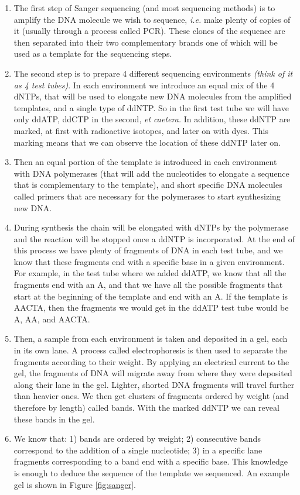 \documentclass[
  11pt,
  twoside]{scrbook}
\providecommand{\tightlist}{%
  \setlength{\itemsep}{0pt}\setlength{\parskip}{0pt}}
\begin{document}
\begin{enumerate}
\def\labelenumi{\arabic{enumi}.}
\tightlist
\item
  The first step of Sanger sequencing (and most sequencing methods) is to amplify the DNA molecule we wish to sequence, \emph{i.e.} make plenty of copies of it (usually through a process called PCR). These clones of the sequence are then separated into their two complementary brands one of which will be used as a template for the sequencing steps.
\item
  The second step is to prepare 4 different sequencing environments \emph{(think of it as 4 test tubes)}. In each environment we introduce an equal mix of the 4 dNTPs, that will be used to elongate new DNA molecules from the amplified templates, and a single type of ddNTP. So in the first test tube we will have only ddATP, ddCTP in the second, \emph{et caetera.} In addition, these ddNTP are marked, at first with radioactive isotopes, and later on with dyes. This marking means that we can observe the location of these ddNTP later on.
\item
  Then an equal portion of the template is introduced in each environment with DNA polymerases (that will add the nucleotides to elongate a sequence that is complementary to the template), and short specific DNA molecules called primers that are necessary for the polymerases to start synthesizing new DNA.
\item
  During synthesis the chain will be elongated with dNTPs by the polymerase and the reaction will be stopped once a ddNTP is incorporated. At the end of this process we have plenty of fragments of DNA in each test tube, and we know that these fragments end with a specific base in a given environment. For example, in the test tube where we added ddATP, we know that all the fragments end with an A, and that we have all the possible fragments that start at the beginning of the template and end with an A. If the template is AACTA, then the fragments we would get in the ddATP test tube would be A, AA, and AACTA.
\item
  Then, a sample from each environment is taken and deposited in a gel, each in its own lane. A process called electrophoresis is then used to separate the fragments according to their weight. By applying an electrical current to the gel, the fragments of DNA will migrate away from where they were deposited along their lane in the gel. Lighter, shorted DNA fragments will travel further than heavier ones. We then get clusters of fragments ordered by weight (and therefore by length) called bands. With the marked ddNTP we can reveal these bands in the gel.
\item
  We know that: 1) bands are ordered by weight; 2) consecutive bands correspond to the addition of a single nucleotide; 3) in a specific lane fragments corresponding to a band end with a specific base. This knowledge is enough to deduce the sequence of the template we sequenced. An example gel is shown in Figure \ref{fig:sanger}.
\end{enumerate}
\end{document}
